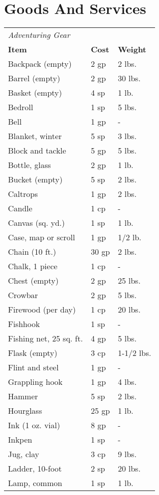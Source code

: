 \section{Goods And Services}
\begin{xtabular}{lll}
\textit{Adventuring Gear}\\
\textbf{Item} & \textbf{Cost} & \textbf{Weight}\\
Backpack (empty) & 2 gp & 2 lbs. \\
 Barrel (empty) & 2 gp & 30 lbs. \\
 Basket (empty) & 4 sp & 1 lb. \\
 Bedroll & 1 sp & 5 lbs. \\
 Bell & 1 gp & - \\
 Blanket, winter & 5 sp & 3 lbs. \\
 Block and tackle & 5 gp & 5 lbs. \\
 Bottle, glass & 2 gp & 1 lb. \\
 Bucket (empty) & 5 sp & 2 lbs. \\
 Caltrops & 1 gp & 2 lbs. \\
 Candle & 1 cp & - \\
 Canvas (sq. yd.) & 1 sp & 1 lb. \\
 Case, map or scroll & 1 gp & 1/2 lb. \\
 Chain (10 ft.) & 30 gp & 2 lbs. \\
 Chalk, 1 piece & 1 cp & - \\
 Chest (empty) & 2 gp & 25 lbs. \\
 Crowbar & 2 gp & 5 lbs. \\
 Firewood (per day) & 1 cp & 20 lbs. \\
 Fishhook & 1 sp & - \\
 Fishing net, 25 sq. ft. & 4 gp & 5 lbs. \\
 Flask (empty) & 3 cp & 1-1/2 lbs. \\
 Flint and steel & 1 gp & - \\
 Grappling hook & 1 gp & 4 lbs. \\
 Hammer & 5 sp & 2 lbs. \\
 Hourglass & 25 gp & 1 lb. \\
 Ink (1 oz. vial) & 8 gp & - \\
 Inkpen & 1 sp & - \\
 Jug, clay & 3 cp & 9 lbs. \\
 Ladder, 10-foot & 2 sp & 20 lbs. \\
 Lamp, common & 1 sp & 1 lb. \\

\end{xtabular}
